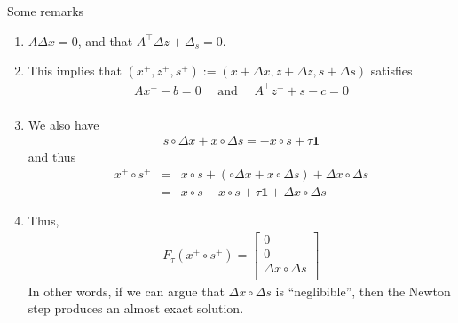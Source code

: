 	Some remarks
	\begin{enumerate}
	\item $A \Delta x= 0$, and that $A^{\top} \Delta z + \Delta_s = 0$.
	\item This implies that $(x^+,z^+,s^+) := (x  + \Delta x, z+ \Delta z, s + \Delta s)$ satisfies
	\begin{eqnarray}
	Ax^+ - b = 0\quad  \text{ and } \quad A^{\top} z^+ + s - c = 0\\
	\end{eqnarray}
	\item We also have
	\begin{eqnarray}
	s \circ \Delta x + x \circ \Delta s = - x \circ s + \tau \mathbf{1}
	\end{eqnarray}
	and thus
	\begin{eqnarray}
	x^+ \circ s^+ &=& x\circ s + \left( \circ \Delta x + x \circ \Delta s\right) + \Delta x \circ \Delta s\\
	 &=&  x \circ s - x \circ s + \tau \mathbf{1} + \Delta  x \circ \Delta s
	\end{eqnarray}
	\item Thus, 
	\begin{eqnarray}
	F_{\tau}(x^+\circ s^+) = \begin{bmatrix} 0 \\
	0 \\
	\Delta  x \circ \Delta s \\
	\end{bmatrix}
	\end{eqnarray}
	In other words, if we can argue that $\Delta x \circ \Delta s$ is ``neglibible'', then the Newton step produces an almost exact solution. 
	\end{enumerate}

